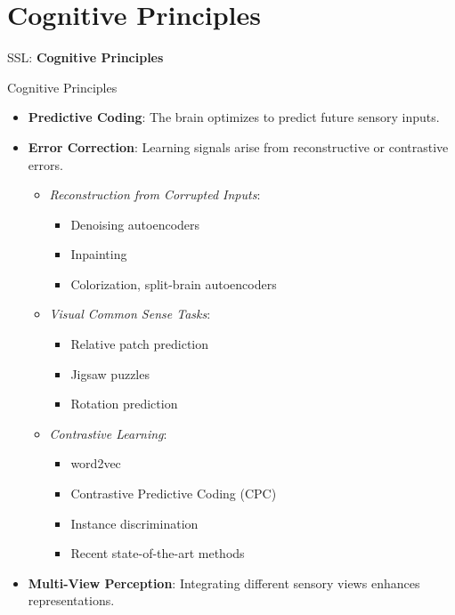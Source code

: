\section{Cognitive Principles}
\begin{frame}{}
    \LARGE SSL: \textbf{Cognitive Principles}
\end{frame}

\begin{frame}[t,allowframebreaks]{Cognitive Principles}
\begin{itemize}
    \item \textbf{Predictive Coding}: The brain optimizes to predict future sensory inputs.
    \item \textbf{Error Correction}: Learning signals arise from reconstructive or contrastive errors.
    \begin{itemize}
        \item \textit{Reconstruction from Corrupted Inputs}:
        \begin{itemize}
            \item Denoising autoencoders
            \item Inpainting
            \item Colorization, split-brain autoencoders
        \end{itemize}
        \item \textit{Visual Common Sense Tasks}:
        \begin{itemize}
            \item Relative patch prediction
            \item Jigsaw puzzles
            \item Rotation prediction
        \end{itemize}
        \item \textit{Contrastive Learning}:
        \begin{itemize}
            \item word2vec
            \item Contrastive Predictive Coding (CPC)
            \item Instance discrimination
            \item Recent state-of-the-art methods
        \end{itemize}
    \end{itemize}
    \item \textbf{Multi-View Perception}: Integrating different sensory views enhances representations.
\end{itemize}
\end{frame}
